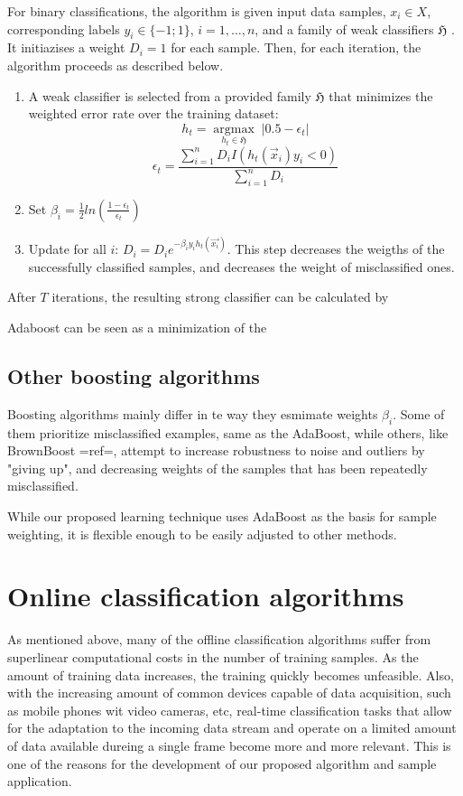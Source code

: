 {	For binary classifications, the algorithm is given input data samples, $x_i \in X$,  corresponding labels $y_i\in \{-1;1\}$, $i = 1,\ldots,n$, and a family of weak classifiers $\mathfrak{H}$ .  It initiazises a weight $D_i=1$ for each sample. Then, for each iteration, the algorithm proceeds as described below.
\begin{enumerate}
\item {A weak classifier is selected from a provided family  $\mathfrak{H}$ that minimizes the weighted error rate over the training dataset:
$$
    h_{t} =\underset{h_{t} \in \mathfrak{H}}{\operatorname{argmax}}  \; \left| 0.5 - \epsilon_{t}\right|
$$}
$$
\epsilon_{t}=\frac{\sum_{i=1}^{n}D_i I(h_t(\vec{x}_i)y_i<0)}{\sum_{i=1}^{n}D_i}
$$
\item {Set $\beta_i=\frac{1}{2}ln\left(\frac{1-\epsilon_{t}}{\epsilon_{t}}\right)$}
\item{Update for all $i$: $D_i=D_i e^{-\beta_i y_i h_t(\vec{x_i})}$. This step decreases the weigths of the successfully classified samples, and decreases the weight of misclassified ones. }
\end{enumerate}

After $T$ iterations, the resulting strong classifier can be calculated by 

Adaboost can be seen as a minimization of the
\subsection{Other boosting algorithms}
Boosting algorithms mainly differ in te way they esmimate weights $\beta_i$. Some of them prioritize misclassified examples, same as the AdaBoost, while others, like BrownBoost {{=ref=}}, attempt to increase robustness to noise and outliers by "giving up", and decreasing weights of the samples that has been repeatedly misclassified. 

While our proposed learning technique uses AdaBoost as the basis for sample weighting, it is flexible enough to be easily adjusted to other methods. 

\section{Online classification algorithms}

As mentioned above, many of the offline classification algorithms suffer from superlinear computational costs in the number of training samples. As the amount of training data increases, the training quickly becomes unfeasible. Also, with the increasing amount of common devices capable of data acquisition, such as mobile phones wit video cameras, etc, real-time classification tasks that allow for the adaptation to the incoming data stream and operate on a limited amount of data available dureing a single frame become more and more relevant. This is one of the reasons for the development of our proposed algorithm and sample application.  

}

